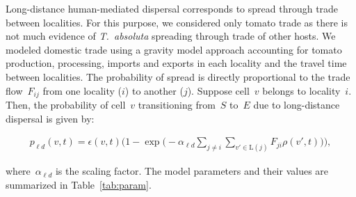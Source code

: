 \documentclass[11pt]{article}
\newcommand{\tuta}{\emph{T.~absoluta}}
\newcommand{\infest}{\rho}
\newcommand{\suitable}{\epsilon}
\newcommand{\pld}{p_{\ell d}}
\newcommand{\ald}{\alpha_{\ell d}}
\newcommand{\locality}{\mathrm{L}}
\theoremstyle{definition}
\begin{document}
Long-distance human-mediated dispersal corresponds to spread through trade
between localities. For this purpose, we considered only tomato trade as
there is not much evidence of \tuta{} spreading through trade of other
hosts. We modeled domestic trade using a gravity model approach accounting
for tomato production, processing, imports and exports in each locality and
the travel time between localities. 
The probability of spread is directly proportional to the trade
flow~$F_{ij}$ from one locality ($i$) to another ($j$).
Suppose cell~$v$ belongs to locality~$i$. Then, the probability of cell~$v$
transitioning from~$S$ to~$E$ due to long-distance dispersal is given by:
\begin{linenomath}
\begin{align}\label{eqn:plocal}
    \pld(v,t)=\suitable(v,t)\bigg(1-
    \exp\Big(-\ald\sum_{j\ne i}\sum_{v'\in\locality(j)}F_{ji}\infest(v',t)\Big)\bigg),
\end{align}
\end{linenomath}
where~$\ald$ is the scaling factor.
The model parameters and their values are summarized in
Table~\ref{tab:param}. 
\end{document}
